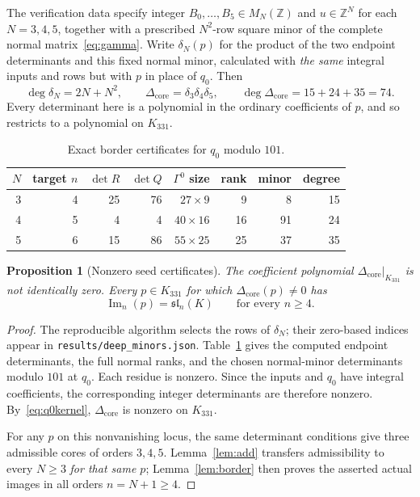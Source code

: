 \documentclass[11pt,reqno]{amsart}
\newtheorem{proposition}[theorem]{Proposition}
\theoremstyle{definition}
\newcommand{\im}{\operatorname{Im}}
\begin{document}
The verification data specify integer $B_0,\ldots,B_5\in M_N(\mathbb Z)$ and $u\in\mathbb Z^N$ for each $N=3,4,5$, together with a prescribed $N^2$-row square minor of the complete normal matrix~\eqref{eq:gamma}.  Write $\delta_N(p)$ for the product of the two endpoint determinants and this fixed normal minor, calculated with \emph{the same} integral inputs and rows but with $p$ in place of $q_0$.  Then
\begin{equation}\label{eq:degree}
 \deg\delta_N=2N+N^2,
 \qquad
 \Delta_{\mathrm{core}}=\delta_3\delta_4\delta_5,
 \qquad \deg\Delta_{\mathrm{core}}=15+24+35=74.
\end{equation}
Every determinant here is a polynomial in the ordinary coefficients of $p$, and so restricts to a polynomial on $K_{331}$.

\begin{table}[ht]
\centering
\caption{Exact border certificates for $q_0$ modulo $101$.}\label{tab:cores}
\small
\begin{tabular}{@{}rrrrrrrr@{}}
\toprule
$N$ & target $n$ & $\det R$ & $\det Q$ & $\Gamma^0$ size & rank & minor & degree\\
\midrule
3&4&25&76&$27\times9$&9&8&15\\
4&5&4&4&$40\times16$&16&91&24\\
5&6&15&86&$55\times25$&25&37&35\\
\bottomrule
\end{tabular}
\end{table}

\begin{proposition}[Nonzero seed certificates]\label{prop:seed}
The coefficient polynomial $\Delta_{\mathrm{core}}\vert_{K_{331}}$ is not identically zero.  Every $p\in K_{331}$ for which $\Delta_{\mathrm{core}}(p)\ne0$ has
\[
 \im_n(p)=\mathfrak{sl}_n(K)\qquad\text{for every }n\ge4.
\]
\end{proposition}
\begin{proof}
The reproducible algorithm selects the rows of $\delta_N$; their zero-based indices appear in \mbox{\texttt{results/deep\_minors.json}}.  Table~\ref{tab:cores} gives the computed endpoint determinants, the full normal ranks, and the chosen normal-minor determinants modulo $101$ at $q_0$.  Each residue is nonzero.  Since the inputs and $q_0$ have integral coefficients, the corresponding integer determinants are therefore nonzero.  By~\eqref{eq:q0kernel}, $\Delta_{\mathrm{core}}$ is nonzero on $K_{331}$.

For any $p$ on this nonvanishing locus, the same determinant conditions give three admissible cores of orders $3,4,5$.  Lemma~\ref{lem:add} transfers admissibility to every $N\ge3$ \emph{for that same $p$}; Lemma~\ref{lem:border} then proves the asserted actual images in all orders $n=N+1\ge4$.
\end{proof}
\end{document}
